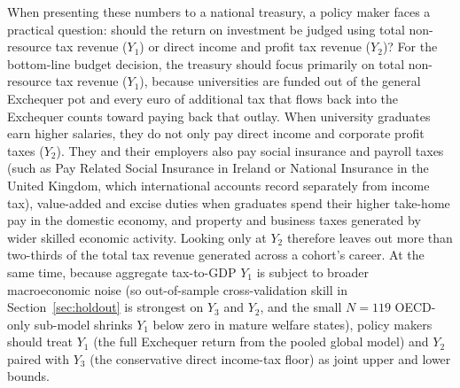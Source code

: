 \documentclass[11pt,a4paper]{article}
\begin{document}
When presenting these numbers to a national treasury, a policy maker faces a practical question: should the return on investment be judged using total non-resource tax revenue ($Y_1$) or direct income and profit tax revenue ($Y_2$)? For the bottom-line budget decision, the treasury should focus primarily on total non-resource tax revenue ($Y_1$), because universities are funded out of the general Exchequer pot and every euro of additional tax that flows back into the Exchequer counts toward paying back that outlay. When university graduates earn higher salaries, they do not only pay direct income and corporate profit taxes ($Y_2$). They and their employers also pay social insurance and payroll taxes (such as Pay Related Social Insurance in Ireland or National Insurance in the United Kingdom, which international accounts record separately from income tax), value-added and excise duties when graduates spend their higher take-home pay in the domestic economy, and property and business taxes generated by wider skilled economic activity. Looking only at $Y_2$ therefore leaves out more than two-thirds of the total tax revenue generated across a cohort's career. At the same time, because aggregate tax-to-GDP $Y_1$ is subject to broader macroeconomic noise (so out-of-sample cross-validation skill in Section~\ref{sec:holdout} is strongest on $Y_3$ and $Y_2$, and the small $N = 119$ OECD-only sub-model shrinks $Y_1$ below zero in mature welfare states), policy makers should treat $Y_1$ (the full Exchequer return from the pooled global model) and $Y_2$ paired with $Y_3$ (the conservative direct income-tax floor) as joint upper and lower bounds.
\end{document}
